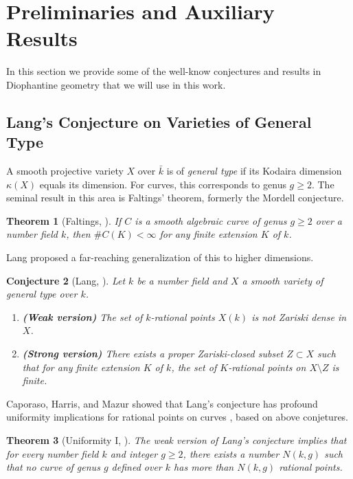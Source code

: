 \documentclass[11pt, a4paper]{amsart}
\newtheorem{thm}{Theorem}[section]
\newtheorem{conj}[thm]{Conjecture}
\theoremstyle{definition}
\newcommand{\kk}{\bar{k}}
\begin{document}
\section{Preliminaries and Auxiliary Results}
\label{Dioph}

In this section we provide some of the well-know conjectures and results in Diophantine geometry that we will use in this work.

\subsection{Lang's Conjecture on Varieties of General Type}
A smooth projective variety $X$ over $\kk$ is of \textit{general type} if its Kodaira dimension $\kappa(X)$ equals its dimension. For curves, this corresponds to genus $g \geq 2$. The seminal result in this area is Faltings' theorem, formerly the Mordell conjecture.

\begin{thm}[Faltings, \cite{Faltings1986}]
	\label{faltings}
	If $C$ is a smooth algebraic curve of genus $g \geq 2$ over a number field $k$, then $\#C(K) < \infty$ for any finite extension $K$ of $k$.
\end{thm}

Lang proposed a far-reaching generalization of this to higher dimensions.

\begin{conj}[Lang, \cite{Lang1986, Lang1991}]
	\label{conj1}
	Let $k$ be a number field and $X$ a smooth variety of general type over $k$.
	\begin{enumerate}
		\item[(a)] \textbf{(Weak version)} The set of $k$-rational points $X(k)$ is not Zariski dense in $X$.
		\item[(b)] \textbf{(Strong version)} There exists a proper Zariski-closed subset $Z \subset X$ such that for any finite extension $K$ of $k$, the set of $K$-rational points on $X \setminus Z$ is finite.
	\end{enumerate}
\end{conj}

Caporaso, Harris, and Mazur showed that Lang's conjecture has profound uniformity implications for rational points on curves \cite{Caporaso1997}, based on above conjetures.

\begin{thm}[Uniformity I, \cite{Caporaso1997}]
	\label{UB}
	The weak version of Lang's conjecture implies that for every number field $k$ and integer $g \geq 2$, there exists a number $N(k,g)$ such that no curve of genus $g$ defined over $k$ has more than $N(k,g)$ rational points.
\end{thm}
\end{document}
